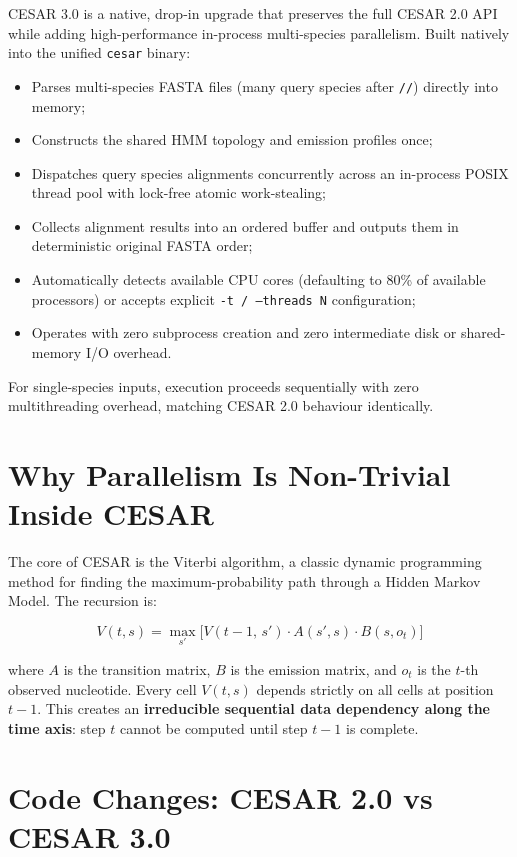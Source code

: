 \documentclass[12pt,a4paper]{article}
\begin{document}
CESAR 3.0 is a native, drop-in upgrade that preserves the full CESAR 2.0 API while adding
high-performance in-process multi-species parallelism. Built natively into the unified
\texttt{cesar} binary:
\begin{itemize}
  \item Parses multi-species FASTA files (many query species after \texttt{//}) directly into memory;
  \item Constructs the shared HMM topology and emission profiles once;
  \item Dispatches query species alignments concurrently across an in-process POSIX thread pool with lock-free atomic work-stealing;
  \item Collects alignment results into an ordered buffer and outputs them in deterministic original FASTA order;
  \item Automatically detects available CPU cores (defaulting to 80\% of available processors) or accepts explicit \texttt{-t / --threads N} configuration;
  \item Operates with zero subprocess creation and zero intermediate disk or shared-memory I/O overhead.
\end{itemize}
For single-species inputs, execution proceeds sequentially with zero multithreading overhead,
matching CESAR 2.0 behaviour identically.

\section{Why Parallelism Is Non-Trivial Inside CESAR}

The core of CESAR is the Viterbi algorithm, a classic dynamic programming method for
finding the maximum-probability path through a Hidden Markov Model. The recursion is:

\[
V(t, s) = \max_{s'} \bigl[ V(t-1,\, s') \cdot A(s',s) \cdot B(s, o_t) \bigr]
\]

where $A$ is the transition matrix, $B$ is the emission matrix, and $o_t$ is the $t$-th
observed nucleotide. Every cell $V(t, s)$ depends strictly on all cells at position
$t-1$. This creates an \textbf{irreducible sequential data dependency along the time
axis}: step $t$ cannot be computed until step $t-1$ is complete.

\section{Code Changes: CESAR 2.0 vs CESAR 3.0}
\end{document}
